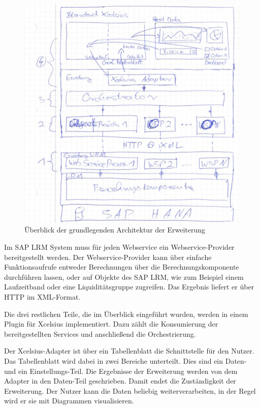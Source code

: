 \begin{onehalfspacing}
\begin{figure}[h]
\centering
\setlength{\unitlength}{1mm}
\includegraphics[width=15cm]{images/Ueberblick-Architektur.jpg}
\caption{Überblick der grundlegenden Architektur der Erweiterung\label{fig:ueberblick-architektur}}
\end{figure} 

Im SAP LRM System muss für jeden Webservice ein Webservice-Provider bereitgestellt werden. Der Webservice-Provider kann über einfache Funktionsaufrufe entweder Berechnungen über die Berechnungskomponente durchführen lassen, oder auf Objekte des SAP LRM, wie zum Beispiel einem Laufzeitband oder eine Liquiditätsgruppe zugreifen. Das Ergebnis liefert er über \gls{HTTP} im \gls{XML}-Format.

Die drei restlichen Teile, die im Überblick eingeführt wurden, werden in einem Plugin für \gls{Xcelsius} implementiert. Dazu zählt die Konsumierung der bereitgestellten Services und anschließend die Orchestrierung.

Der \gls{Xcelsius}-Adapter ist über ein Tabellenblatt die Schnittstelle für den Nutzer. Das Tabellenblatt wird dabei in zwei Bereiche unterteilt. Dies sind ein Daten- und ein Einstellungs-Teil. Die Ergebnisse der Erweiterung werden von dem Adapter in den Daten-Teil geschrieben. Damit endet die Zuständigkeit der Erweiterung. Der Nutzer kann die Daten beliebig weiterverarbeiten, in der Regel wird er sie mit Diagrammen visualisieren.


\end{onehalfspacing}
